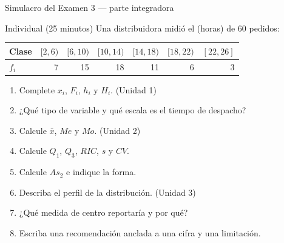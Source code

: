 \documentclass[aspectratio=169,10pt]{beamer}
\begin{document}
\begin{frame}{Simulacro del Examen 3 — parte integradora}
  \begin{alertblock}{Individual (25 minutos)}
    \scriptsize
    Una distribuidora midió el  (horas) de 60 pedidos:

    \vspace{0.12cm}
    \centering
    \begin{tabular}{@{}lrrrrrr@{}}
      \toprule
      \textbf{Clase} & $[2,6)$ & $[6,10)$ & $[10,14)$ & $[14,18)$ & $[18,22)$ &
      $[22,26]$ \\
      \midrule
      $f_i$ & 7 & 15 & 18 & 11 & 6 & 3 \\
      \bottomrule
    \end{tabular}

    \vspace{0.18cm}
    \raggedright
    \begin{enumerate}\setlength{\itemsep}{-0.07cm}
      \item Complete $x_i$, $F_i$, $h_i$ y $H_i$. \hfill (Unidad 1)
      \item ¿Qué tipo de variable y qué escala es el tiempo de despacho?
      \item Calcule $\bar{x}$, $Me$ y $Mo$. \hfill (Unidad 2)
      \item Calcule $Q_1$, $Q_3$, $RIC$, $s$ y $CV$.
      \item Calcule $As_2$ e indique la forma.
      \item Describa el perfil de la distribución. \hfill (Unidad 3)
      \item ¿Qué medida de centro reportaría y por qué?
      \item Escriba una recomendación anclada a una cifra y una limitación.
    \end{enumerate}
  \end{alertblock}
\end{frame}
\end{document}
